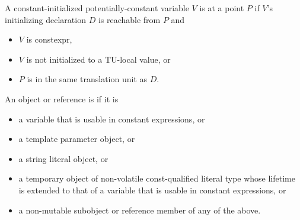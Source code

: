\pnum
A constant-initialized potentially-constant variable $V$ is
 at a point $P$ if
$V$'s initializing declaration $D$ is reachable from $P$ and
\begin{itemize}
\item $V$ is constexpr,
\item $V$ is not initialized to a TU-local value, or
\item $P$ is in the same translation unit as $D$.
\end{itemize}
An object or reference is  if it is
\begin{itemize}
\item a variable that is usable in constant expressions, or
\item a template parameter object, or
\item a string literal object, or
\item a temporary object of non-volatile const-qualified literal type
  whose lifetime is extended
  to that of a variable that is usable in constant expressions, or
\item a non-mutable subobject or reference member of any of the above.
\end{itemize}

